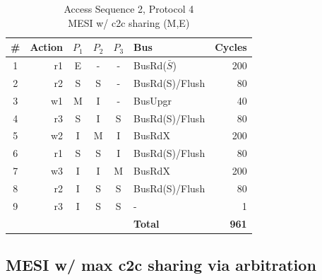 \documentclass[12pt, letterpaper]{report}
\begin{document}
\begin{table}[H]
	\setlength{\extrarowheight}{.5ex}
	\centering
	\begin{tabular}{ |c|r|c|c|c|l|r| }
		\hline
		\textbf{\#} & \textbf{Action} & \textbf{$P_1$} & \textbf{$P_{2}$} & \textbf{$P_3$} & \textbf{Bus} & \textbf{Cycles} \\
		\hline
		1 & r1 & E & - & - & BusRd($\bar{S}$) & 200 \\
		\hline
		2 & r2 & S & S & - & BusRd(S)/Flush & 80 \\
		\hline
		3 & w1 & M & I & - & BusUpgr & 40 \\
		\hline
		4 & r3 & S & I & S & BusRd(S)/Flush & 80 \\
		\hline
		5 & w2 & I & M & I & BusRdX & 200 \\
		\hline
		6 & r1 & S & S & I & BusRd(S)/Flush & 80 \\
		\hline
		7 & w3 & I & I & M & BusRdX & 200 \\
		\hline
		8 & r2 & I & S & S & BusRd(S)/Flush & 80 \\
		\hline
		9 & r3 & I & S & S & - & 1 \\
		\hline \hline \hline
		\cellcolor{null} & \cellcolor{null} & \cellcolor{null} & \cellcolor{null} & \cellcolor{null} & \textbf{Total} & \textbf{961} \\
		\hline
	\end{tabular}
	\caption{Access Sequence 2, Protocol 4\\MESI w/ c2c sharing (M,E)}
\end{table}



\subsection{MESI w/ max c2c sharing via arbitration}
\end{document}
